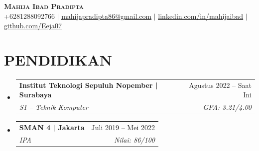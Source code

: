 \documentclass[letterpaper,11pt]{article}
\makeatletter
\newcommand{\resumeSubheading}[4]{
	\vspace{-2pt}\item
	\begin{tabular*}{0.97\textwidth}[t]{l@{\extracolsep{\fill}}r}
		\textbf{#1} & #2 \\
		\textit{\small#3} & \textit{\small #4} \\
	\end{tabular*}\vspace{-7pt}
}
\newcommand{\resumeSubHeadingListStart}{\begin{itemize}[leftmargin=0.15in, label={}]}
\newcommand{\resumeSubHeadingListEnd}{\end{itemize}}
\makeatother
\begin{document}
	
	
	\begin{center}
		\textbf{\Huge \scshape Mahija Ibad Pradipta} \\ \vspace{1pt}
		\small +6281288092766 $|$ \href{mailto:mahijapradipta86@gmail.com}{\underline{mahijapradipta86@gmail.com}} $|$ 
		\href{https://linkedin.com/in/mahijaibad}{\underline{linkedin.com/in/mahijaibad}} $|$
		\href{https://github.com/Eeja07}{\underline{github.com/Eeja07}}
	\end{center}
	
	
	\section{PENDIDIKAN}
	\resumeSubHeadingListStart
	\resumeSubheading
	{Institut Teknologi Sepuluh Nopember | Surabaya}{Agustus 2022 – Saat Ini}
	{S1 – Teknik Komputer}{GPA: 3.21/4.00}
	\resumeSubheading
	{SMAN 4 | Jakarta}{Juli 2019 – Mei 2022}
	{IPA}{Nilai: 86/100}
	\resumeSubHeadingListEnd
	
\end{document}
